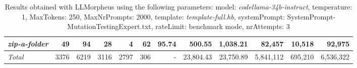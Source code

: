 \begin{table*}
{\begin{tabular}{l||r|r|r|r|r|r||r|r||r|r|r}
   \hline
   \textit{zip-a-folder} & 49 & 94 & 28 & 4 & 62 & 95.74 & 500.55 & 1,038.21 & 82,457 & 10,518 & 92,975 \\ 
   \hline
   \textit{Total} & 3376 & 6219 & 3116 & 2797 & 306 & - & 23,804.43  & 23,750.89 & 5,841,112 & 695,210 & 6,536,322 \\ 
 \end{tabular}
 }
 \caption{Results obtained with LLMorpheus using the following parameters: 
   model: \textit{codellama-34b-instruct}, 
   temperature: 1, 
   MaxTokens: 250, 
   MaxNrPrompts: 2000, 
   template: \textit{template-full.hb}, 
   systemPrompt: SystemPrompt-MutationTestingExpert.txt, 
   rateLimit: benchmark mode, 
   nrAttempts: 3  
 }
\end{table*}

